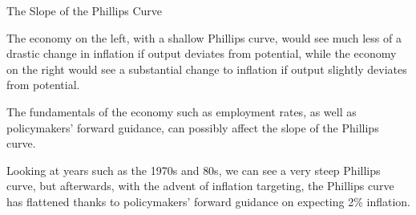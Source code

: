 \documentclass[8pt]{extarticle}
\begin{document}
\begin{problem}{The Slope of the Phillips Curve}
\begin{center}
      \qquad \qquad
      \qquad \qquad
      \begin{tcolorbox}[colback = white, title = (a), breakable]
        The economy on the left, with a shallow Phillips curve, would see much less of a drastic change in inflation if output deviates from potential, while the economy on the right would see a substantial change to inflation if output slightly deviates from potential.
      \end{tcolorbox}
      \begin{tcolorbox}[colback = white, title = (b), breakable]
        The fundamentals of the economy such as employment rates, as well as policymakers' forward guidance, can possibly affect the slope of the Phillips curve.
      \end{tcolorbox}
      \begin{tcolorbox}[colback = white, title = (c), breakable]
        Looking at years such as the 1970s and 80s, we can see a very steep Phillips curve, but afterwards, with the advent of inflation targeting, the Phillips curve has flattened thanks to policymakers' forward guidance on expecting 2\% inflation.
      \end{tcolorbox}
    \end{center}
  \end{problem}
\end{document}
